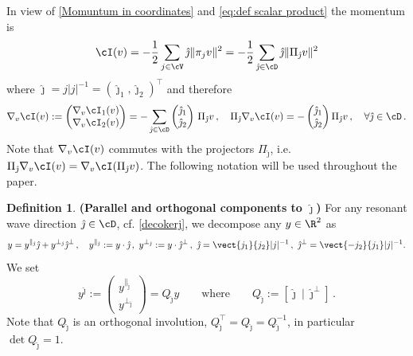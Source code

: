 \documentclass[11pt,a4paper,reqno]{article}
\numberwithin{equation}{section}
\theoremstyle{definition}
\newtheorem{definition}[theorem]{Definition}
\begin{document}
  In view of \eqref{Momuntum in coordinates} and \eqref{eq:def scalar product} the momentum is  
    \begin{equation}\label{eq:cI}
        \cI(v)=-\frac12\sum_{j\in \cV} \hat\jmath \|\pi_{j} v\|^2=-\frac12\sum_{\hat\jmath \in \cD} \hat\jmath \|\Pi_{\hat\jmath} v\|^2
    \end{equation}
    where $\hat\jmath=j |j|^{-1} = (\hat\jmath_1, \hat\jmath_2)^\top $ and therefore 
    \begin{equation}\label{eq:Nabla cI}
        \nabla_v\cI(v):=\begin{pmatrix}
            \nabla_v \cI_1(v)\\
            \nabla_v \cI_2(v)
        \end{pmatrix} =
        -\sum_{\hat\jmath \in \cD} \begin{pmatrix}
            \hat\jmath_1\\
            \hat\jmath_2
        \end{pmatrix} \, \Pi_{\hat\jmath} v \, , \quad 
        \Pi_{\hat \jmath}\nabla_v \cI(v)
        =-\begin{pmatrix}
            \hat\jmath_1\\
            \hat\jmath_2
        \end{pmatrix} \Pi_{\hat\jmath}v
        \, ,\quad \forall 
        \hat\jmath \in \cD \, .
    \end{equation}
    Note that $\nabla_v\cI(v)$ commutes with the projectors $\Pi_{\hat \jmath}$,  i.e. $\Pi_{\hat \jmath}\nabla_v\cI(v)=\nabla_v\cI(\Pi_{\hat \jmath}v)$.
  The following notation  will be used throughout the paper.
\begin{definition}
{\bf (Parallel and orthogonal components to $ \hat \jmath $)}
    For any 
    resonant wave direction $ \hat\jmath \in \cD $,  cf. \eqref{decokerj}, 
    we decompose any  $y\in \R^2 $
    as
 \begin{equation}\label{eq:compoc}
    y=y^{\parallel_{\hat\jmath}} \hat\jmath + 
    y^{\bot_{\hat\jmath}} \hat\jmath^\bot \, , \quad  
        y^{\parallel_{\hat\jmath}}:= y\cdot \hat\jmath \, , \
        y^{\bot_{\hat\jmath}}:=y\cdot \hat\jmath^\bot \, , \ \hat\jmath = \vect{j_1}{j_2} |j|^{-1} \, , \ \hat\jmath^\bot 
    = \vect{-j_2}{j_1} |j|^{-1}.
    \end{equation}
We set 
    \begin{equation}\label{eq:def yj}
        y^{\hat\jmath}:=\begin{pmatrix}
            y^{\parallel_{\hat\jmath}}\\
            y^{\bot_{\hat\jmath}} 
        \end{pmatrix} = Q_{\hat\jmath} y \qquad \text{where}
        \qquad Q_{\hat\jmath} := [ \hat\jmath \ | \  \hat\jmath^\bot ] \, . 
    \end{equation}
Note that $Q_{\hat\jmath} $ is an orthogonal involution,  
$ Q_{\hat\jmath}^\top = Q_{\hat\jmath}  = Q_{\hat\jmath}^{-1} $, in particular $ \det Q_{\hat\jmath} = 1 $.  
\end{definition}
\end{document}
